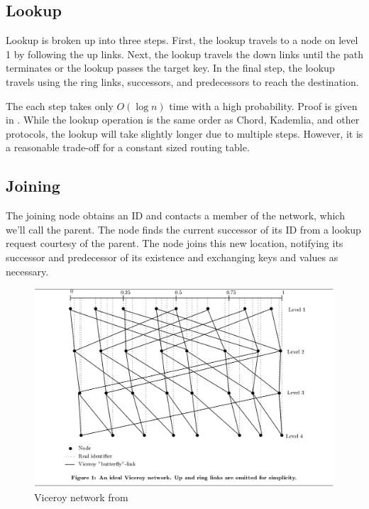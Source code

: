 \documentclass[10pt,letterpaper]{report}
\begin{document}
\subsection*{Lookup}
Lookup is broken up into three steps.
First, the lookup travels to a node on level 1 by following the up links.  Next, the lookup travels the down links until the path terminates or the lookup passes the target key. 
In the final step, the lookup travels using the ring links, successors, and predecessors to reach the destination.


The each step takes only $O(\log n)$ time with a high probability. Proof is given in \cite{malkhi2001viceroy}.
While the lookup operation is the same order as Chord, Kademlia, and other protocols, the lookup will take slightly longer due to multiple steps.  However, it is a reasonable trade-off for a constant sized routing table.

\subsection*{Joining}
The joining node obtains an ID and contacts a member of the network, which we'll call the parent.
The node  finds the current successor of its ID from a lookup request courtesy of the parent. 
The node joins this new location, notifying its successor and predecessor of its existence and exchanging keys and values as necessary.



\begin{figure}
  \caption{Viceroy network from \cite{malkhi2001viceroy}}
  \centering
  \includegraphics[width=1.0\textwidth]{viceroy}
\end{figure}
\end{document}
